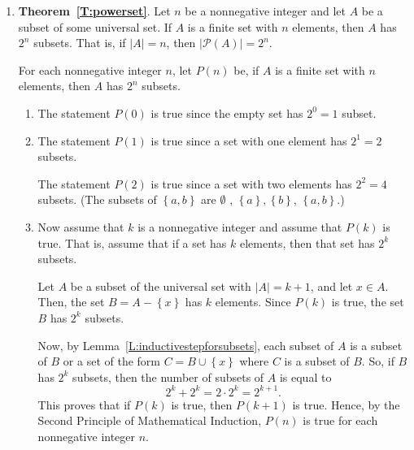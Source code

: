 \begin{enumerate}
\item \setcounter{equation}{0}
\noindent
\textbf{Theorem~\ref{T:powerset}}.  Let  $n$  be a nonnegative integer and let  $A$  be a subset of some universal set.  If  $A$  is a finite set with  $n$  elements, then  $A$  has  $2^n $  subsets.  That is,  if  $\left| A \right| = n$, then  $\left| {\mathcal{P}\left( A \right)} \right| = 2^n $.

\vskip6pt
\noindent
For each nonnegative integer  $n$, let  $P\left( n \right)$ be, if  $A$  is a finite set with  
$n$  elements, then  $A$  has  $2^n $  subsets.

\begin{enumerate}
\item The statement  $P\left( 0 \right)$ is true since the empty set has  $2^0  = 1$ subset. 

\item The statement  $P\left( 1 \right)$ is true since a set with one element has  $2^1  = 2$ subsets.

The statement  $P\left( 2 \right)$ is true since a set with two elements has  $2^2  = 4$
 subsets. (The subsets of  $\left\{ {a, b} \right\}$ are  
$\emptyset$ , $\left\{ a \right\}, \left\{ b \right\}$, $\left\{ {a, b} \right\}$.)

\item Now assume that  $k$  is a nonnegative integer and assume that  $P\left( k \right)$ is true.  That is, assume that if a set has  $k$  elements, then that set has  $2^k $ subsets. 

Let  $A$  be a subset of the universal set with  $\left| A \right| = k + 1$, and let  $x \in A$.  Then, the set  $B = A - \left\{ x \right\}$  has  $k$  elements.  Since  $P\left( k \right)$
 is true, the set  $B$  has  $2^k $ subsets.

Now, by Lemma~\ref{L:inductivestepforsubsets},  each subset of  $A$  is a subset of  $B$  or a set of the form  
$C = B \cup \left\{ x \right\}$ where  $C$  is a subset of  $B$.  So, if  $B$  has  $2^k $
 subsets, then the number of subsets of  $A$ is equal to
\[
2^k  + 2^k  = 2 \cdot 2^k  = 2^{k + 1} .
\]
This proves that if  $P\left( k \right)$ is true, then  $P\left( {k + 1} \right)$ is true.  Hence, by the Second Principle of Mathematical Induction,  $P\left( n \right)$ is true for each nonnegative integer  $n$.
\end{enumerate}

\end{enumerate}





\hbreak
\endinput

\item 
\begin{enumerate}
\item 
\begin{figure}[h]
\texttt{[image: xfigexer-41-9a.bmp]}
\end{figure}

\item 
\begin{figure}[h]
\texttt{[image: xfigexer-41-9b.bmp]}
\end{figure}
